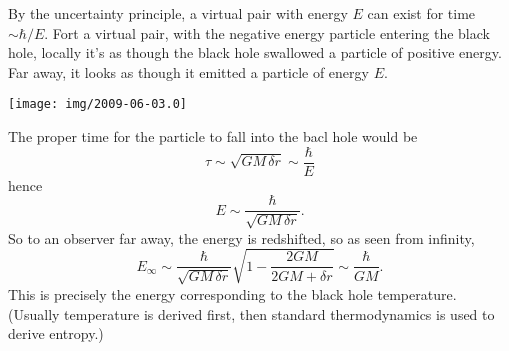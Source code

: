 By the uncertainty principle, a virtual pair with energy $E$ can exist
for time $\sim \hbar/E$. Fort a virtual pair, with the negative energy
particle entering the black hole, locally it's as though the black hole
swallowed a particle of positive energy. Far away, it looks as though it
emitted a particle of energy $E$.
\begin{center}
  \texttt{[image: img/2009-06-03.0]}
\end{center}
The proper time for the particle to fall into the bacl hole would be
\begin{equation}
\tau\sim\sqrt{GM\,\delta r}\sim\frac{\hbar}{E}
\end{equation}
hence
\begin{equation}
E\sim\frac{\hbar}{\sqrt{GM\,\delta r}}.
\end{equation}
So to an observer far away, the energy is redshifted, so as seen from
infinity,
\begin{equation}
E_{\infty}\sim\frac{\hbar}{\sqrt{GM\,\delta r}}\sqrt{1 -
  \frac{2GM}{2GM+\delta r}}\sim\frac{\hbar}{GM}.
\end{equation}
This is precisely the energy corresponding to the black hole temperature.
(Usually temperature is derived first, then standard thermodynamics is
used to derive entropy.)


